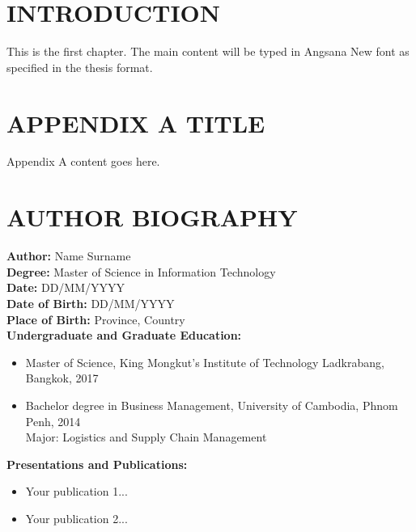 \documentclass[12pt,a4paper]{report}
\begin{document}
\chapter{INTRODUCTION}
This is the first chapter. The main content will be typed in Angsana New font as specified in the thesis format.

\vfill
\clearpage

\appendix
\chapter{APPENDIX A TITLE}
Appendix A content goes here.

\chapter*{AUTHOR BIOGRAPHY}

\noindent \textbf{Author:} \hspace{2cm} Name Surname \\
\textbf{Degree:} \hspace{1.9cm} Master of Science in Information Technology \\
\textbf{Date:} \hspace{2.2cm} DD/MM/YYYY \\
\textbf{Date of Birth:} \hspace{1cm} DD/MM/YYYY \\
\textbf{Place of Birth:} \hspace{0.9cm} Province, Country \\

\vspace{12pt}
\noindent \textbf{Undergraduate and Graduate Education:}
\begin{itemize}
    \setlength\itemsep{0em} %
    \item Master of Science, King Mongkut's Institute of Technology Ladkrabang, Bangkok, 2017
    \item Bachelor degree in Business Management, University of Cambodia, Phnom Penh, 2014\\
    Major: Logistics and Supply Chain Management
\end{itemize}

\vspace{12pt}
\noindent \textbf{Presentations and Publications:}
\begin{itemize}
    \setlength\itemsep{0em}
    \item Your publication 1...
    \item Your publication 2...
\end{itemize}
\end{document}
